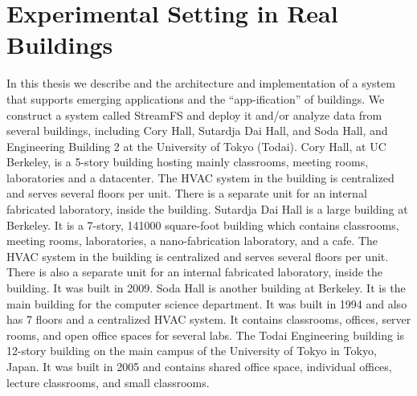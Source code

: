 \section{Experimental Setting in Real Buildings}
In this thesis we describe and the architecture and implementation of a system that supports emerging applications and the ``app-ification''
of buildings.  We construct a system called StreamFS and deploy it and/or analyze data from several buildings, including
Cory Hall, Sutardja Dai Hall, and Soda Hall, and Engineering Building 2 at the University of Tokyo (Todai).
Cory Hall, at UC Berkeley, is a 5-story building hosting mainly classrooms, meeting rooms, laboratories and a datacenter.
The HVAC system in the building is centralized and serves several floors per unit.
There is a separate unit for an internal fabricated laboratory, inside the building.
Sutardja Dai Hall is a large building at Berkeley.  It is a 7-story, 141000 square-foot 
 building which contains classrooms, meeting rooms, laboratories, a nano-fabrication laboratory, and a cafe.
The HVAC system in the building is centralized and serves several floors per unit.
There is also a separate unit for an internal fabricated laboratory, inside the building.  It was built in 2009.
Soda Hall is another building at Berkeley.  It is the main building for the computer science department.
It was built in 1994 and also has 7 floors and a centralized HVAC system.  It contains classrooms, 
offices, server rooms, and open office spaces for several labs.
The Todai Engineering building is 12-story building on the main campus of the University of Tokyo in Tokyo, Japan.
It was built in 2005 and contains shared office space, individual offices, lecture classrooms, and small
classrooms.

